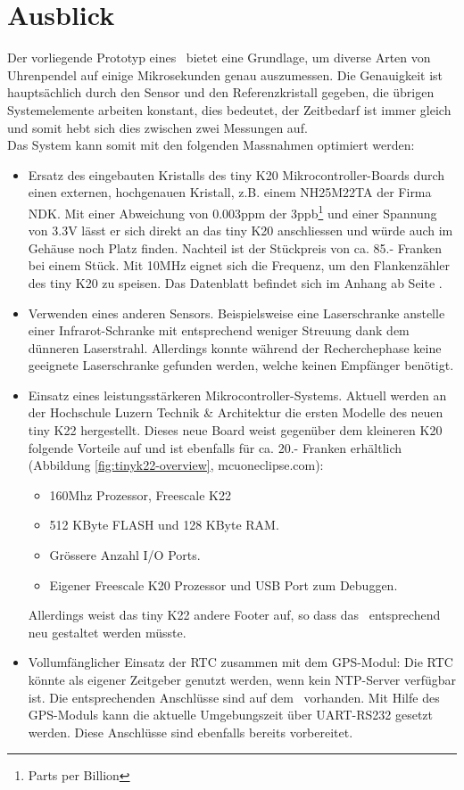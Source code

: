 \section{Ausblick}
Der vorliegende Prototyp eines \documenttitle\ bietet eine Grundlage, um diverse Arten von Uhrenpendel auf einige Mikrosekunden genau auszumessen. Die Genauigkeit ist hauptsächlich durch den Sensor und den Referenzkristall gegeben, die übrigen Systemelemente arbeiten konstant, dies bedeutet, der Zeitbedarf ist immer gleich und somit hebt sich dies zwischen zwei Messungen auf.\\
Das System kann somit mit den folgenden Massnahmen optimiert werden:
\begin{itemize}
	\item Ersatz des eingebauten Kristalls des tiny K20 Mikrocontroller-Boards durch einen externen, hochgenauen Kristall, z.B. einem NH25M22TA der Firma NDK. Mit einer Abweichung von 0.003ppm der 3ppb\footnote{Parts per Billion} und einer Spannung von 3.3V lässt er sich direkt an das tiny K20 anschliessen und würde auch im Gehäuse noch Platz finden. Nachteil ist der Stückpreis von ca. 85.- Franken bei einem Stück. Mit 10MHz eignet sich die Frequenz, um den Flankenzähler des tiny K20 zu speisen. Das Datenblatt befindet sich im Anhang ab Seite \pageref{app:NH25M22TA}.
	\item Verwenden eines anderen Sensors. Beispielsweise eine Laserschranke anstelle einer Infrarot-Schranke mit entsprechend weniger Streuung dank dem dünneren Laserstrahl. Allerdings konnte während der Recherchephase keine geeignete Laserschranke gefunden werden, welche keinen Empfänger benötigt.
	\item Einsatz eines leistungsstärkeren Mikrocontroller-Systems. Aktuell werden an der Hochschule Luzern Technik \& Architektur die ersten Modelle des neuen tiny K22 hergestellt. Dieses neue Board weist gegenüber dem kleineren K20 folgende Vorteile auf und ist ebenfalls für ca. 20.- Franken erhältlich (Abbildung \ref{fig:tinyk22-overview}, mcuoneclipse.com):
	\begin{itemize}
		\item 160Mhz Prozessor, Freescale K22
		\item 512 KByte FLASH und 128 KByte RAM.
		\item Grössere Anzahl I/O Ports.
		\item Eigener Freescale K20 Prozessor und USB Port zum Debuggen. 
	\end{itemize}
	Allerdings weist das tiny K22 andere Footer auf, so dass das \hwb\ entsprechend neu gestaltet werden müsste.
	\item Vollumfänglicher Einsatz der RTC zusammen mit dem GPS-Modul: Die RTC könnte als eigener Zeitgeber genutzt werden, wenn kein NTP-Server verfügbar ist. Die entsprechenden \iic Anschlüsse sind auf dem \hwb\ vorhanden. Mit Hilfe des GPS-Moduls kann die aktuelle Umgebungszeit über UART-RS232 gesetzt werden. Diese Anschlüsse sind ebenfalls bereits vorbereitet.  
\end{itemize}
